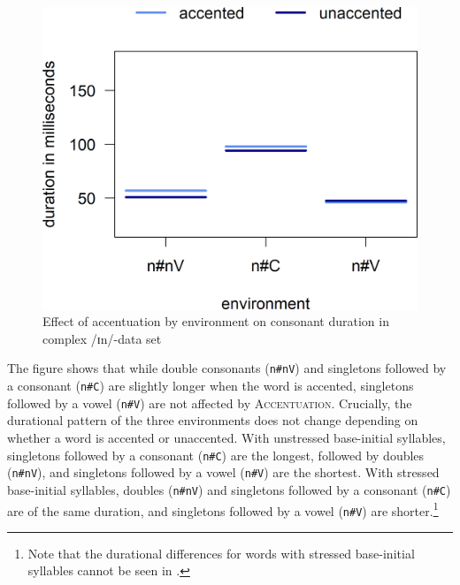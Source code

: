 	\begin{figure} 
		
		\includegraphics [scale=0.5] {images/Experiment/InModelInterEnvAcc}
		\caption{Effect of accentuation by environment on consonant duration in complex /ɪn/-data set}
		\label{fig:Env Acc In experiment} 
	\end{figure}

\largerpage The figure shows that while double consonants (\texttt{n\#nV}) and singletons followed by a consonant (\texttt{n\#C}) are slightly longer when the word is accented, singletons followed by a vowel (\texttt{n\#V}) are not affected by \textsc{Accentuation}. Crucially, 
the durational pattern of the three environments does not change depending on whether a word is accented or unaccented. 
With unstressed base-initial syllables, singletons followed by a consonant (\texttt{n\#C}) are the longest, followed by doubles (\texttt{n\#nV}), and singletons followed by a vowel (\texttt{n\#V}) are the shortest.
With stressed base-initial syllables, doubles (\texttt{n\#nV}) and singletons followed by a consonant (\texttt{n\#C}) are of the same duration, and singletons followed by a vowel (\texttt{n\#V}) are shorter.\footnote{Note that the durational differences for words with stressed base-initial syllables cannot be seen in .}




